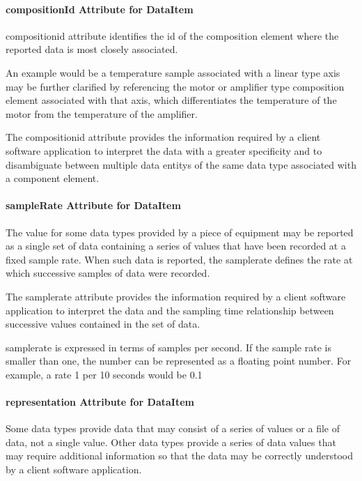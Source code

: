 \paragraph{compositionId Attribute for DataItem}\mbox{}

\gls{compositionid} attribute identifies the id of the \gls{composition} element where the reported data is most closely associated.

An example would be a \gls{temperature sample} associated with a \gls{linear} type axis may be further clarified by referencing the \gls{motor} or \gls{amplifier} type \gls{composition} element associated with that axis, which differentiates the temperature of the motor from the temperature of the amplifier.

\newpage

The \gls{compositionid} attribute provides the information required by a client software application to interpret the data with a greater specificity and to disambiguate between multiple \glspl{data entity} of the same data type associated with a \gls{component} element.

\paragraph{sampleRate Attribute for DataItem}\mbox{}

The value for some data types provided by a piece of equipment may be reported as a single set of data containing a series of values that have been recorded at a fixed sample rate.  When such data is reported, the \gls{samplerate} defines the rate at which successive samples of data were recorded.

The \gls{samplerate} attribute provides the information required by a client software application to interpret the data and the sampling time relationship between successive values contained in the set of data.

\gls{samplerate} is expressed in terms of samples per second.  If the sample rate is smaller than one, the number can be represented as a floating point number.  For example, a rate 1 per 10 seconds would be 0.1

\paragraph{representation Attribute for DataItem}\label{sec:representation Attribute for DataItem}\mbox{}

Some data types provide data that may consist of a series of values or a file of data, not a single value.  Other data types provide a series of data values that may require additional information so that the data may be correctly understood by a client software application.

